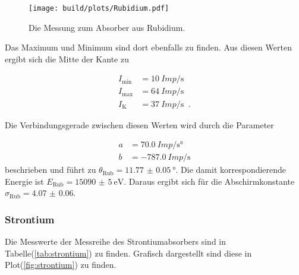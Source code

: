          \begin{figure}[H]
            \centering
            \texttt{[image: build/plots/Rubidium.pdf]}
            \caption{Die Messung zum Absorber aus Rubidium.}
            \label{fig:rub}
          \end{figure}

          \noindent Das Maximum und Minimum sind dort ebenfalls zu finden. Aus diesen Werten ergibt sich die Mitte der Kante 
          zu

          \begin{align*}
              I_{\text{min}} &= \SI{10}{Imp\per\second}\\
              I_{\text{max}} &= \SI{64}{Imp\per\second}\\
              I_{\text{K}} &= \SI{37}{Imp\per\second} \; \; \text{.}
          \end{align*}

          \noindent Die Verbindungsgerade zwischen diesen Werten wird durch die Parameter 

          \begin{align*}
              a & = \SI{70.0}{Imp\per\second\degree}\\
              b & = \SI{-787.0}{Imp\per\second}
          \end{align*}
          \noindent beschrieben und führt zu $\theta_{\text{Rub}} = \SI{11.77(5)}{\degree}$. Die damit korrespondierende Energie ist $E_{\text{Rub}} = \SI{15090(5)}{\electronvolt}$. 
          Daraus ergibt sich für die Abschirmkonstante $\sigma_{\text{Rub}}= \num{4.07(6)}$.

    \subsubsection{Strontium}
            
          \noindent Die Messwerte der Messreihe des Strontiumabsorbers sind in Tabelle(\ref{tab:strontium}) zu finden. Grafisch dargestellt sind diese in Plot(\ref{fig:strontium}) zu finden.

